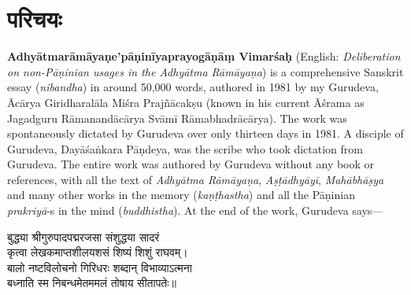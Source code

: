 %
%
%

\setcounter{footnote}{0}
\renewcommand\chaptername{}
\chapter[परिचयः]{परिचयः}
\fontsize{14}{21}\selectfont
\begin{sloppypar}\justifying\noindent\hspace{10mm} {\engtextfont \textbf{Adhyātmarāmāyaṇe’pāṇinīyaprayogāṇāṃ Vimarśaḥ} (English: \textit{Deliberation on non-Pāṇinian usages in the Adhyātma Rāmāyaṇa}) is a comprehensive Sanskrit essay (\textit{nibandha}) in around 50,000 words, authored in 1981 by my Gurudeva, Ācārya Giridharalāla Miśra Prajñācakṣu (known in his current Āśrama as Jagadguru Rāmanandācārya Svāmī Rāmabhadrācārya). The work was spontaneously dictated by Gurudeva over only thirteen days in 1981. A disciple of Gurudeva, Dayāśaṅkara Pāṇdeya, was the scribe who took dictation from Gurudeva. The entire work was authored by Gurudeva without any book or references, with all the text of \textit{Adhyātma Rāmāyaṇa}, \textit{Aṣṭādhyāyī}, \textit{Mahābhāṣya} and many other works in the memory (\textit{kaṇṭhastha}) and all the Pāṇinian \textit{prakriyā}‑s in the mind (\textit{buddhistha}). At the end of the work, Gurudeva says—}\end{sloppypar}
\vspace{-2mm}
\begin{center}
बुद्ध्या श्रीगुरुपादपद्मरजसा संशुद्धया सादरं\nopagebreak\\
कृत्वा लेखकमाप्तशीलयशसं शिष्यं शिशुं राघवम्।\nopagebreak\\
बालो नष्टविलोचनो गिरिधरः शब्दान् विभाव्याऽत्मना\nopagebreak\\
बध्नाति स्म निबन्धमेतममलं तोषाय सीतापतेः॥
\end{center}

